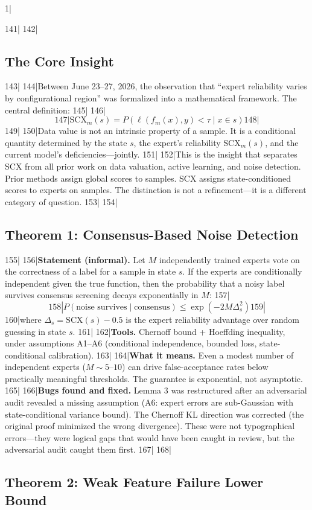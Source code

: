 1|\documentclass[12pt,a4paper]{article}
\begin{document}
141|
142|\subsection{The Core Insight}
143|
144|Between June 23–27, 2026, the observation that ``expert reliability varies by configurational region'' was formalized into a mathematical framework. The central definition:
145|
146|\[
147|\text{SCX}_m(s) = P(\ell(f_m(x), y) < \tau \mid x \in s)
148|\]
149|
150|Data value is not an intrinsic property of a sample. It is a conditional quantity determined by the state $s$, the expert's reliability $\text{SCX}_m(s)$, and the current model's deficiencies—jointly.
151|
152|This is the insight that separates SCX from all prior work on data valuation, active learning, and noise detection. Prior methods assign global scores to samples. SCX assigns state-conditioned scores to experts on samples. The distinction is not a refinement—it is a different category of question.
153|
154|\subsection{Theorem 1: Consensus-Based Noise Detection}
155|
156|\textbf{Statement (informal).} Let $M$ independently trained experts vote on the correctness of a label for a sample in state $s$. If the experts are conditionally independent given the true function, then the probability that a noisy label survives consensus screening decays exponentially in $M$:
157|\[
158|P(\text{noise survives} \mid \text{consensus}) \leq \exp(-2M\Delta_s^2)
159|\]
160|where $\Delta_s = \text{SCX}(s) - 0.5$ is the expert reliability advantage over random guessing in state $s$.
161|
162|\textbf{Tools.} Chernoff bound + Hoeffding inequality, under assumptions A1–A6 (conditional independence, bounded loss, state-conditional calibration).
163|
164|\textbf{What it means.} Even a modest number of independent experts ($M \sim 5$–$10$) can drive false-acceptance rates below practically meaningful thresholds. The guarantee is exponential, not asymptotic.
165|
166|\textbf{Bugs found and fixed.} Lemma 3 was restructured after an adversarial audit revealed a missing assumption (A6: expert errors are sub-Gaussian with state-conditional variance bound). The Chernoff KL direction was corrected (the original proof minimized the wrong divergence). These were not typographical errors—they were logical gaps that would have been caught in review, but the adversarial audit caught them first.
167|
168|\subsection{Theorem 2: Weak Feature Failure Lower Bound}
\end{document}
